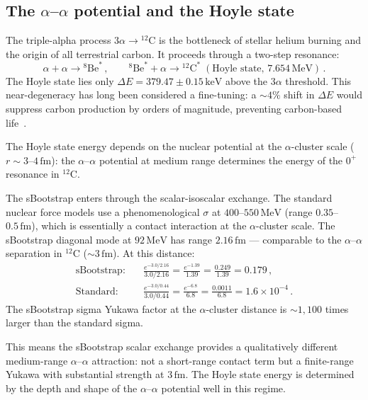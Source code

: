 \documentclass[12pt,a4paper]{article}
\newcommand{\MeV}{\,\text{MeV}}
\newcommand{\keV}{\,\text{keV}}
\begin{document}
\subsection{The $\alpha$--$\alpha$ potential and the Hoyle state}
\label{subsec:hoyle}

The triple-alpha process $3\alpha \to {}^{12}\text{C}$ is the
bottleneck of stellar helium burning and the origin of all
terrestrial carbon.  It proceeds through a two-step resonance:
\begin{equation}
  \alpha + \alpha \to {}^8\text{Be}^*\,,\qquad
  {}^8\text{Be}^* + \alpha \to {}^{12}\text{C}^*
  \;(\text{Hoyle state, }7.654\MeV)\,.
\end{equation}
The Hoyle state lies only $\Delta E = 379.47 \pm 0.15\keV$ above the
$3\alpha$ threshold.  This near-degeneracy has long been considered
a fine-tuning: a $\sim 4\%$ shift in $\Delta E$ would suppress
carbon production by orders of magnitude, preventing carbon-based
life~\cite{Hoyle1954,OberhumerCSoto2000}.

The Hoyle state energy depends on the nuclear potential at the
$\alpha$-cluster scale ($r \sim 3$--$4\,\text{fm}$): the
$\alpha$--$\alpha$ potential at medium range determines the energy
of the $0^+$ resonance in ${}^{12}\text{C}$.

The sBootstrap enters through the scalar-isoscalar exchange.  The
standard nuclear force models use a phenomenological $\sigma$ at
$400$--$550\MeV$ (range $0.35$--$0.5\,\text{fm}$), which is
essentially a contact interaction at the $\alpha$-cluster scale.
The sBootstrap diagonal mode at $92\MeV$ has range $2.16\,\text{fm}$
--- comparable to the $\alpha$--$\alpha$ separation in ${}^{12}\text{C}$
($\sim 3\,\text{fm}$).  At this distance:
\begin{align}
  \text{sBootstrap:}\quad &
    \frac{e^{-3.0/2.16}}{3.0/2.16} = \frac{e^{-1.39}}{1.39}
    = \frac{0.249}{1.39} = 0.179\,,\\
  \text{Standard:}\quad &
    \frac{e^{-3.0/0.44}}{3.0/0.44} = \frac{e^{-6.8}}{6.8}
    = \frac{0.0011}{6.8} = 1.6 \times 10^{-4}\,.
\end{align}
The sBootstrap sigma Yukawa factor at the $\alpha$-cluster distance
is $\sim 1{,}100$ times larger than the standard sigma.

This means the sBootstrap scalar exchange provides a qualitatively
different medium-range $\alpha$--$\alpha$ attraction: not a
short-range contact term but a finite-range Yukawa with substantial
strength at $3\,\text{fm}$.  The Hoyle state energy is determined
by the depth and shape of the $\alpha$--$\alpha$ potential well in
this regime.
\end{document}

